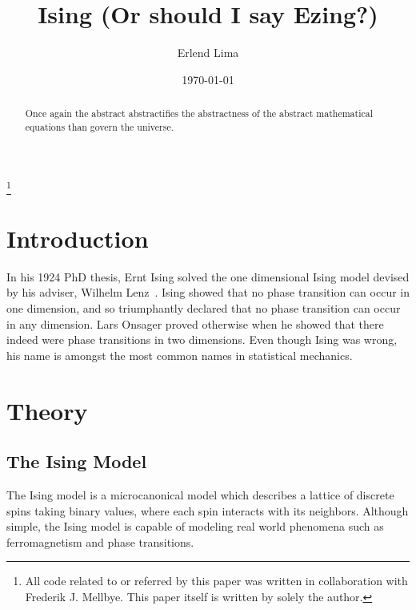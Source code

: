 \documentclass[aps,reprint]{revtex4-1}
\begin{document}
\title{Ising (Or should I say Ezing?)}
\author{Erlend Lima}
\thanks{All code related to or referred by this paper was written in
  collaboration with Frederik J. Mellbye. This paper itself is written by
 solely the author.}
\date{\today}

\begin{abstract}
Once again the abstract abstractifies the abstractness of the abstract mathematical
equations than govern the universe.
\end{abstract}
\maketitle
\tableofcontents
\makeatletter
\let\toc@pre\relax
\let\toc@post\relax
\makeatother

\newpage

\section{Introduction}
\label{sec:introduction}

In his 1924 PhD thesis, Ernt Ising 
solved the one dimensional Ising model devised by his adviser, Wilhelm
Lenz~\cite{weicai}. Ising showed that no phase transition can occur in one
dimension, and so triumphantly declared that no phase transition can occur in
any dimension. Lars Onsager proved otherwise when he showed that there indeed
were phase transitions in two dimensions. Even though Ising was wrong, his name
is amongst the most common names in statistical mechanics. 
\section{Theory}
\label{sec:theory}

\subsection{The Ising Model}
\label{sec:isingmodel}

The Ising model is a microcanonical model which describes a lattice of discrete spins taking binary values, where each
spin interacts with its neighbors. Although simple, the Ising model is capable of modeling real
world phenomena such as ferromagnetism and phase transitions.
\end{document}
